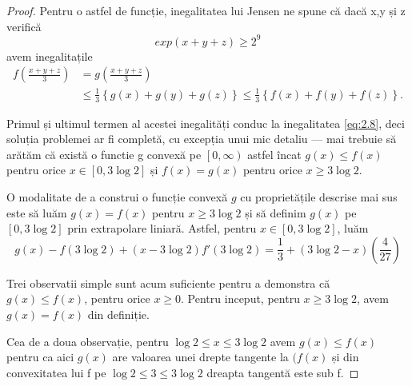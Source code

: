 \documentclass[a4paper,12pt,oneside]{report}
\begin{document}
\begin{proof}
Pentru o astfel de funcție, inegalitatea lui Jensen ne spune  că dacă x,y și z verifică \[exp \left ( x + y + z \right )\geq  2^{9} \] avem inegalitațile
\begin{displaymath}
\begin{split}
  f\left ( \frac{x + y + z}{3} \right ) &= g\left ( \frac{x + y + z}{3} \right )\\
   &\leq  \frac{1}{3}\left \{ g\left ( x \right ) + g\left ( y \right ) + g\left ( z \right ) \right \} \leq  \frac{1}{3}\left \{ f\left ( x \right ) + f\left ( y \right ) + f\left ( z \right ) \right \}.
  \end{split}
\end{displaymath}

Primul și ultimul termen al acestei inegalități conduc la inegalitatea \ref{eq:2.8}, deci soluția problemei ar fi completă, cu excepția unui mic detaliu — mai trebuie să arătăm că există o functie  g convexă pe \( \left [ 0 , \infty  \right ) \) astfel încat  \(g\left ( x \right ) \leq  f\left ( x \right )\) pentru orice  \(x \in \left [ 0 , 3\log 2 \right ]\) și \( f\left ( x \right ) = g\left ( x \right )\) pentru orice \( x \geq 3\log 2\).

O modalitate de a construi o funcție convexă \(g\) cu proprietățile  descrise mai sus este să luăm  \(g\left ( x \right ) = f\left ( x \right )\) pentru \(x \geq  3\log2\) și să definim \(g\left ( x \right )\) pe \(\left [ 0 , 3\log 2 \right ]\) prin extrapolare liniară. Astfel, pentru \(x\in \left [ 0 , 3\log 2 \right ]\), luăm
\begin{displaymath}
  g\left ( x \right ) - f\left ( 3\log 2 \right ) + \left ( x - 3\log 2 \right ){f}'\left ( 3\log2 \right ) = \frac{1}{3} + \left ( 3\log2 - x  \right )\left ( \frac{4}{27} \right )
\end{displaymath}

Trei observatii simple sunt acum suficiente pentru a demonstra că \(g\left ( x \right )\leq f\left ( x \right )\), pentru orice \(x\geq 0\). Pentru inceput, pentru \(x\geq 3\log 2\), avem \(g\left ( x \right ) = f\left ( x \right )\) din definiție.

Cea de a doua observație, pentru \(\log 2 \leq  x \leq  3\log 2\) avem  \(g( x )\leq f\left ( x \right ) \) pentru ca aici  \(g\left ( x \right )\) are valoarea unei drepte tangente la \((f\left ( x \right )\) și din convexitatea lui f pe \(\log 2 \leq  3 \leq 3\log 2\) dreapta tangentă este sub f.


\end{proof}
\end{document}
